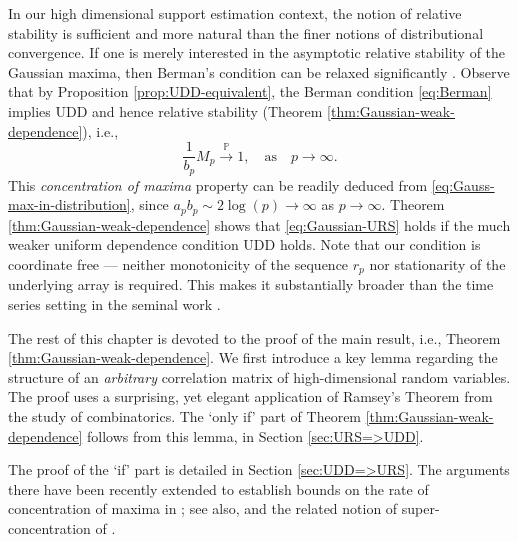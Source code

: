 In our high dimensional support estimation context, the notion of relative stability is sufficient and more natural than the finer notions of distributional convergence.
If one is merely interested in the asymptotic relative stability of the Gaussian maxima, then Berman's condition can be relaxed significantly 
\citep[see also, Theorem 4.1 of][]{berman1964limit}.  Observe that by Proposition \ref{prop:UDD-equivalent},  the Berman condition \eqref{eq:Berman} implies UDD and hence relative stability (Theorem \ref{thm:Gaussian-weak-dependence}), i.e., 
\begin{equation} \label{eq:Gaussian-URS}
  \frac{1}{b_p} M_p \stackrel{\mathbb P}{\to} 1,\quad\mbox{as}\quad p\to\infty.
\end{equation}
This {\em concentration of maxima} property can be readily deduced from \eqref{eq:Gauss-max-in-distribution}, since $a_p b_p \sim 2\log(p) \to \infty$ as $p\to\infty$.
Theorem \ref{thm:Gaussian-weak-dependence} shows that \eqref{eq:Gaussian-URS} holds if the much weaker uniform dependence condition UDD holds. 
Note that our condition is coordinate free --- neither monotonicity of the sequence $r_p$ nor stationarity of the underlying array is required. This
makes it substantially broader than the time series setting in the seminal work \cite{berman1964limit}.


\medskip

The rest of this chapter is devoted to the proof of the main result, i.e., Theorem \ref{thm:Gaussian-weak-dependence}. 
We first introduce a key lemma regarding the structure of an {\em arbitrary} correlation matrix of high-dimensional random variables.
The proof uses a surprising, yet elegant application of Ramsey's Theorem from the study of combinatorics.
The `only if' part of Theorem \ref{thm:Gaussian-weak-dependence} follows from this lemma, in Section \ref{sec:URS=>UDD}. 

The proof of the `if' part is detailed in Section \ref{sec:UDD=>URS}.
The arguments there have been recently extended to establish bounds on the rate of concentration of maxima in \cite{kartsioukas2019rate}; see also, \cite{tanguy2015some} and the related notion of super-concentration of \cite{chatterjee2014superconcentration}.

